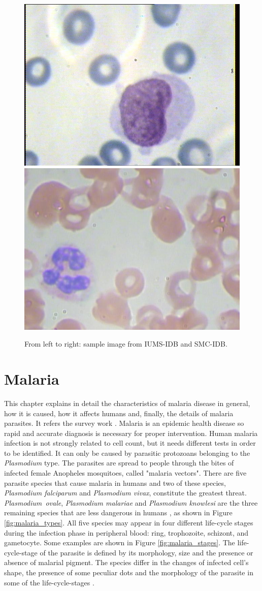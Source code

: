 \documentclass[final,a4paper,12pt,english]{UnicaPhdThesis3}
\begin{document}
\begin{figure}[h]
	\centering
	\includegraphics[height=0.33\textwidth]{images/2016_1_mva/IUMS}
	\includegraphics[height=0.33\textwidth]{images/2016_1_mva/SMC}
	\caption{\label{fig:datasets_samples}From left to right: sample image from IUMS-IDB and SMC-IDB.}
\end{figure}

\newpage
\section{Malaria}
\label{malaria_survey}
This chapter explains in detail the characteristics of malaria disease in general, how it is caused, how it affects humans and, finally, the details of malaria parasites. It refers the survey work \cite{Loddo2018}.
Malaria is an epidemic health disease so rapid and accurate diagnosis is necessary for proper intervention. 
Human malaria infection is not strongly related to cell count, but it needs different tests in order to be identified. It can only be caused by parasitic protozoans belonging to the \emph{Plasmodium} type. The parasites are spread to people through the bites of infected female Anopheles mosquitoes, called "malaria vectors".
There are five parasite species that cause malaria in humans and two of these species, \emph{Plasmodium falciparum} and \emph{Plasmodium vivax}, constitute the greatest threat. \emph{Plasmodium~ovale}, \emph{Plasmodium malariae} and \emph{Plasmodium knowlesi} are the three remaining species that are less dangerous in humans \cite{WHO_dec_2016}, as shown in Figure \ref{fig:malaria_types}.
All five species may appear in four different life-cycle stages during the infection phase in peripheral blood: ring, trophozoite, schizont, and gametocyte. Some examples are shown in Figure \ref{fig:malaria_stages}.
The life-cycle-stage of the parasite is defined by its morphology, size and the presence or absence of malarial pigment.
The species differ in the changes of infected cell's shape, the presence of some peculiar dots and the morphology of the parasite in some of the life-cycle-stages \cite{Somasekar2011}.
\end{document}
